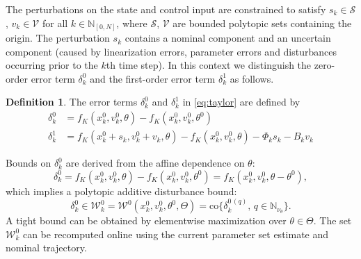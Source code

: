 \documentclass{IEEEtran}
\theoremstyle{definition}
\newtheorem{definition}{Definition}
\theoremstyle{remark}
\begin{document}
The perturbations on the state and control input are constrained to satisfy $s_k\in \mathcal{S}$, $v_k\in \mathcal{V}$ for all $k\in \mathbb{N}_{[0,N]}$, where $\mathcal{S}$, $\mathcal{V}$ are bounded polytopic sets containing the origin. The perturbation $s_k$ contains a nominal component and an uncertain component (caused by linearization errors, parameter errors and disturbances occurring prior to the $k$th time step). In this context we distinguish the zero-order error term $\delta^0_k$ and the first-order error term $\delta^1_k$
as follows.

\begin{definition}\label{def:delta} The error terms $\delta^0_k$ and $\delta^1_k$ in \eqref{eq:taylor} are defined by
\begin{align*}
\delta^0_k &= f_K(x_k^0, v^0_k, \theta) - f_K(x_k^0, v^0_k, \theta^0)
\\
\delta^1_k &= f_K(x_k^0 + s_k, v^0_k + v_k, \theta) - f_K(x_k^0, v^0_k, \theta) - \Phi_k s_k \!-\! B_k v_k
\end{align*}
\end{definition}

Bounds on $\delta^0_k$ are derived from the affine dependence on $\theta$:
\[
\delta^0_k = f_K(x^0_k, v^0_k,{\theta}) -f_K(x^0_k, v^0_k,\theta^0) = f_K (x^0_k, v^0_k, \theta - \theta^0) ,
\]
which implies a polytopic additive disturbance bound: 
\begin{equation}\label{eq:W0_def}
\delta^0_k \in \mathcal{W}^0_k = \mathcal{W}^0(x^0_k,v^0_k,\theta^0,\Theta) = \mathrm{co}
\{\delta^{0\,(q)}_k, \, q \in \mathbb{N}_{\nu_\theta}\}.
\end{equation}
A tight bound can be obtained by elementwise maximization over $\theta \in \Theta$. The set $\mathcal{W}_k^0$ can be recomputed online using the current parameter set estimate and nominal trajectory.
\end{document}
